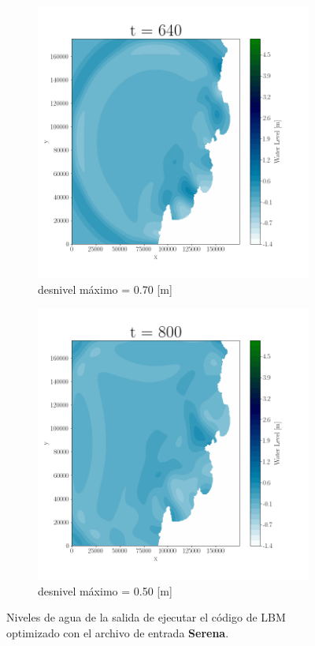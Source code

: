 \begin{figure}[H]
\begin{subfigure}[b]{.4\linewidth}
\includegraphics[width=\linewidth]{Figures/Plots/Serena5.png}
\caption{desnivel máximo = 0.70 [m]}
\end{subfigure}
\begin{subfigure}[b]{.4\linewidth}
\includegraphics[width=\linewidth]{Figures/Plots/Serena6.png}
\caption{desnivel máximo = 0.50 [m]}
\end{subfigure}
\caption{Niveles de agua de la salida de ejecutar el código de LBM optimizado con el archivo de entrada \textbf{Serena}.}
\label{fig:26}
\end{figure}

